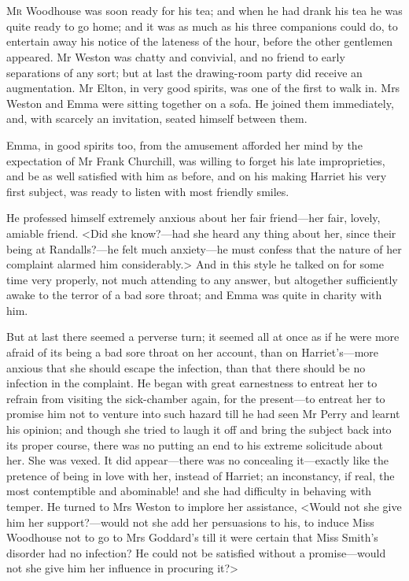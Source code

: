 \chapter[Chapter \thechapter]{}
\lettrine[lraise=0.3]{M}{r} Woodhouse was soon ready for his tea; and when he had drank his tea he was quite ready to go home; and it was as much as his three companions could do, to entertain away his notice of the lateness of the hour, before the other gentlemen appeared. Mr Weston was chatty and convivial, and no friend to early separations of any sort; but at last the drawing-room party did receive an augmentation. Mr Elton, in very good spirits, was one of the first to walk in. Mrs Weston and Emma were sitting together on a sofa. He joined them immediately, and, with scarcely an invitation, seated himself between them.

Emma, in good spirits too, from the amusement afforded her mind by the expectation of Mr Frank Churchill, was willing to forget his late improprieties, and be as well satisfied with him as before, and on his making Harriet his very first subject, was ready to listen with most friendly smiles.

He professed himself extremely anxious about her fair friend—her fair, lovely, amiable friend. <Did she know?—had she heard any thing about her, since their being at Randalls?—he felt much anxiety—he must confess that the nature of her complaint alarmed him considerably.> And in this style he talked on for some time very properly, not much attending to any answer, but altogether sufficiently awake to the terror of a bad sore throat; and Emma was quite in charity with him.

But at last there seemed a perverse turn; it seemed all at once as if he were more afraid of its being a bad sore throat on her account, than on Harriet's—more anxious that she should escape the infection, than that there should be no infection in the complaint. He began with great earnestness to entreat her to refrain from visiting the sick-chamber again, for the present—to entreat her to promise him not to venture into such hazard till he had seen Mr Perry and learnt his opinion; and though she tried to laugh it off and bring the subject back into its proper course, there was no putting an end to his extreme solicitude about her. She was vexed. It did appear—there was no concealing it—exactly like the pretence of being in love with her, instead of Harriet; an inconstancy, if real, the most contemptible and abominable! and she had difficulty in behaving with temper. He turned to Mrs Weston to implore her assistance, <Would not she give him her support?—would not she add her persuasions to his, to induce Miss Woodhouse not to go to Mrs Goddard's till it were certain that Miss Smith's disorder had no infection? He could not be satisfied without a promise—would not she give him her influence in procuring it?>


